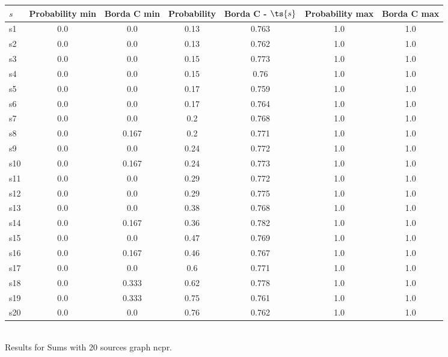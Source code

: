 \documentclass{article}
\begin{document}
\noindent\begin{tabular}{|l|c|c|c|c|c|c|}
\hline
$s$& Probability min & Borda C min & Probability & Borda C - $\ts{s}$ & Probability max & Borda C max\\
\hline
s1 &0.0 & 0.0 & 0.13 & 0.763 & 1.0 & 1.0\\
\hline
s2 &0.0 & 0.0 & 0.13 & 0.762 & 1.0 & 1.0\\
\hline
s3 &0.0 & 0.0 & 0.15 & 0.773 & 1.0 & 1.0\\
\hline
s4 &0.0 & 0.0 & 0.15 & 0.76 & 1.0 & 1.0\\
\hline
s5 &0.0 & 0.0 & 0.17 & 0.759 & 1.0 & 1.0\\
\hline
s6 &0.0 & 0.0 & 0.17 & 0.764 & 1.0 & 1.0\\
\hline
s7 &0.0 & 0.0 & 0.2 & 0.768 & 1.0 & 1.0\\
\hline
s8 &0.0 & 0.167 & 0.2 & 0.771 & 1.0 & 1.0\\
\hline
s9 &0.0 & 0.0 & 0.24 & 0.772 & 1.0 & 1.0\\
\hline
s10 &0.0 & 0.167 & 0.24 & 0.773 & 1.0 & 1.0\\
\hline
s11 &0.0 & 0.0 & 0.29 & 0.772 & 1.0 & 1.0\\
\hline
s12 &0.0 & 0.0 & 0.29 & 0.775 & 1.0 & 1.0\\
\hline
s13 &0.0 & 0.0 & 0.38 & 0.768 & 1.0 & 1.0\\
\hline
s14 &0.0 & 0.167 & 0.36 & 0.782 & 1.0 & 1.0\\
\hline
s15 &0.0 & 0.0 & 0.47 & 0.769 & 1.0 & 1.0\\
\hline
s16 &0.0 & 0.167 & 0.46 & 0.767 & 1.0 & 1.0\\
\hline
s17 &0.0 & 0.0 & 0.6 & 0.771 & 1.0 & 1.0\\
\hline
s18 &0.0 & 0.333 & 0.62 & 0.778 & 1.0 & 1.0\\
\hline
s19 &0.0 & 0.333 & 0.75 & 0.761 & 1.0 & 1.0\\
\hline
s20 &0.0 & 0.0 & 0.76 & 0.762 & 1.0 & 1.0\\
\hline
\end{tabular}\\

\noindent Results for Sums with 20 sources graph ncpr.
\end{document}
